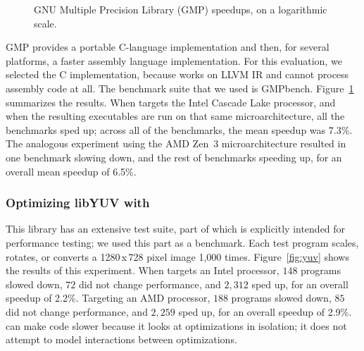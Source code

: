 \begin{figure}[tbp]
  \centering
  \hfill
  \caption{GNU Multiple Precision Library (GMP) speedups, on a logarithmic scale.}
  \label{fig:gmp}
\end{figure}


GMP provides a portable C-language implementation and then, for
several platforms, a faster assembly language implementation.
%
For this evaluation, we selected the C implementation, because \minotaur{}
works on LLVM IR and cannot process assembly code at all.
%
The benchmark suite that we used is
GMPbench.
%
Figure~\ref{fig:gmp} summarizes the results.
%
When \minotaur{} targets the Intel Cascade Lake processor, and when the
resulting executables are run on that same microarchitecture,
all the benchmarks sped up;
across all of the benchmarks, the mean speedup was 7.3\%.
%
The analogous experiment using the AMD Zen~3 microarchitecture
resulted in one benchmark slowing down, and the rest of benchmarks
speeding up, for an overall mean speedup of 6.5\%.


\subsubsection{Optimizing libYUV with \minotaur{}}





This library has an extensive test suite, part of which is explicitly
intended for performance testing; we used this part as a benchmark.
%
Each test program scales, rotates, or converts a 1280\,x\,728 pixel
image 1,000 times.
%
Figure~\ref{fig:yuv} shows the results of this experiment.
%
When \minotaur{} targets an Intel processor, $148$ programs slowed down, $72$
did not change performance, and $2,312$ sped up, for an overall speedup of
2.2\%.
%
Targeting an AMD processor, $188$ programs slowed down, $85$ did not
change performance, and $2,259$ sped up, for an overall speedup of 2.9\%.
%
\minotaur{} can make code slower because it looks at optimizations in
isolation; it does not attempt to model interactions between
optimizations.


